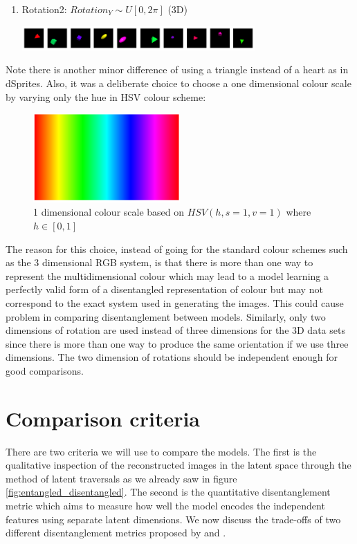 \begin{enumerate}
\begin{center}
            \end{center}
            \item Rotation2: $Rotation_Y\sim U[0, 2\pi]$ (3D)
            \begin{center}
                \includegraphics[width=0.7\textwidth]{imgs/2pos_scl_shape_2rot_col.png}
            \end{center}
        \end{enumerate}
        
        Note there is another minor difference of using a triangle instead of a heart as in dSprites. Also, it was a deliberate choice to choose a one dimensional colour scale by varying only the hue in HSV colour scheme:
        
        \begin{figure}[H]
            \centering
            \includegraphics[width=0.5\textwidth]{imgs/colour_scale.png}
            \caption{1 dimensional colour scale based on $HSV(h, s=1, v=1)$ where $h\in[0, 1]$ }
            \label{fig:colour_scale}
        \end{figure}
        
        The reason for this choice, instead of going for the standard colour schemes such as the 3 dimensional RGB system, is that there is more than one way to represent the multidimensional colour which may lead to a model learning a perfectly valid form of a disentangled representation of colour but may not correspond to the exact system used in generating the images. This could cause problem in comparing disentanglement between models. Similarly, only two dimensions of rotation are used instead of three dimensions for the 3D data sets since there is more than one way to produce the same orientation if we use three dimensions. The two dimension of rotations should be independent enough for good comparisons.
        
    \section{Comparison criteria}
        There are two criteria we will use to compare the models. The first is the qualitative inspection of the reconstructed images in the latent space through the method of latent traversals as we already saw in figure \ref{fig:entangled_disentangled}. The second is the quantitative disentanglement metric which aims to measure how well the model encodes the independent features using separate latent dimensions. We now discuss the trade-offs of two different disentanglement metrics proposed by \cite{higgins2017beta} and \cite{kim2018disentangling}.
        
